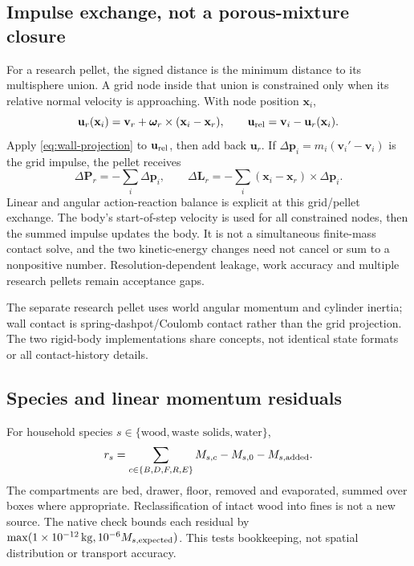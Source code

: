 \subsection{Impulse exchange, not a porous-mixture closure}
For a research pellet, the signed distance is the minimum distance to its
multisphere union. A grid node inside that union is constrained only when its
relative normal velocity is approaching. With node position $\mathbf{x}_i$,
\begin{equation}
 \mathbf{u}_r(\mathbf{x}_i)=\mathbf{v}_r+
       \boldsymbol\omega_r\times(\mathbf{x}_i-\mathbf{x}_r),\qquad
 \mathbf{u}_{\rm rel}=\mathbf{v}_i-\mathbf{u}_r(\mathbf{x}_i).
\end{equation}
Apply \eqref{eq:wall-projection} to $\mathbf{u}_{\rm rel}$, then add back
$\mathbf{u}_r$. If $\Delta\mathbf{p}_i=m_i(\mathbf{v}_i'-\mathbf{v}_i)$ is
the grid impulse, the pellet receives
\begin{equation}
 \Delta\mathbf{P}_r=-\sum_i\Delta\mathbf{p}_i,\qquad
 \Delta\mathbf{L}_r=-\sum_i(\mathbf{x}_i-\mathbf{x}_r)\times\Delta\mathbf{p}_i.
 \label{eq:coupling-impulse}
\end{equation}
Linear and angular action-reaction balance is explicit at this grid/pellet
exchange. The body's start-of-step velocity is used for all constrained nodes,
then the summed impulse updates the body. It is not a simultaneous finite-mass
contact solve, and the two kinetic-energy changes need not cancel or sum to a
nonpositive number. Resolution-dependent leakage, work accuracy and multiple
research pellets remain acceptance gaps.

The separate research pellet uses world angular momentum and cylinder inertia;
wall contact is spring-dashpot/Coulomb contact rather than the grid projection.
The two rigid-body implementations share concepts, not identical state formats
or all contact-history details.

\subsection{Species and linear momentum residuals}
For household species $s\in\{\text{wood},\text{waste solids},\text{water}\}$,
\begin{equation}
 r_s=\sum_{c\in\{B,D,F,R,E\}}M_{s,c}
   -M_{s,0}-M_{s,\rm added}. \label{eq:species-residual}
\end{equation}
The compartments are bed, drawer, floor, removed and evaporated, summed over
boxes where appropriate. Reclassification of intact wood into fines is not a
new source. The native check bounds each residual by
$\max(\SI{1e-12}{kg},10^{-6}M_{s,\rm expected})$.
This tests bookkeeping, not spatial distribution or transport accuracy.


